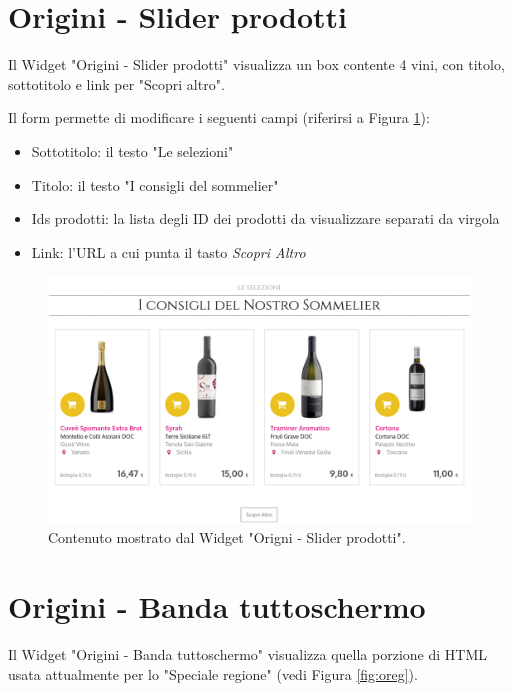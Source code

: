 


\newpage


\section{Origini - Slider prodotti}
Il Widget "Origini - Slider prodotti" visualizza un box contente
4 vini, con titolo, sottotitolo e link per "Scopri altro".

Il form permette di modificare i seguenti campi (riferirsi a Figura \ref{fig:oprod}):
\begin{itemize}
\item Sottotitolo: il testo "Le selezioni"
\item Titolo: il testo "I consigli del sommelier"
\item Ids prodotti: la lista degli ID dei prodotti da visualizzare separati da virgola
\item Link: l'URL a cui punta il tasto \emph{Scopri Altro}
\end{itemize}

\begin{figure}
  \includegraphics[width=\textwidth]{figure/oprod.png}
  \caption{Contenuto mostrato dal Widget "Origni - Slider prodotti".}
  \label{fig:oprod}
\end{figure}


\newpage
\section{Origini - Banda tuttoschermo}
Il Widget "Origini - Banda tuttoschermo" visualizza quella porzione di HTML
usata attualmente per lo "Speciale regione" (vedi Figura \ref{fig:oreg}).

